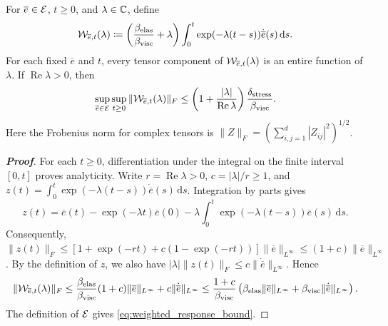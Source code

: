 {\begin{lemma}\label{lem:weighted_response}
For $\overline e\in{\mathcal{E}}$, $t\ge0$, and $\lambda\in\mathbb{C}$, define
\begin{equation}\label{eq:weighted_response_def}
{\mathcal{W}}_{\overline e,t}(\lambda)\coloneqq\left(\frac{\beta_{\rm elas}}{\beta_{\rm visc}}+\lambda\right)\int_0^t\exp(-\lambda(t-s))\dot{\overline e}(s)\,\mathrm ds.
\end{equation}
For each fixed $\overline e$ and $t$, every tensor component of ${\mathcal{W}}_{\overline e,t}(\lambda)$ is an entire function of $\lambda$. If $\operatorname{Re}\lambda>0$, then
\begin{equation}\label{eq:weighted_response_bound}
\sup_{\overline e\in{\mathcal{E}}}\sup_{t\ge0}\|{\mathcal{W}}_{\overline e,t}(\lambda)\|_F\le\left(1+\frac{|\lambda|}{\operatorname{Re}\lambda}\right)\frac{\delta_{\rm stress}}{\beta_{\rm visc}}.
\end{equation}
Here the Frobenius norm for complex tensors is $\|Z\|_F=(\sum_{i,j=1}^d|Z_{ij}|^2)^{1/2}$.
\end{lemma}

\begin{proof}[\bf Proof]
For each $t\ge0$, differentiation under the integral on the finite interval $[0,t]$ proves analyticity. Write $r=\operatorname{Re}\lambda>0$, $c=|\lambda|/r\ge1$, and $z(t)=\int_0^t\exp(-\lambda(t-s))\dot{\overline e}(s)\,\mathrm ds$. Integration by parts gives
\begin{equation*}
z(t)=\overline e(t)-\exp(-\lambda t)\overline e(0)-\lambda\int_0^t\exp(-\lambda(t-s))\overline e(s)\,\mathrm ds.
\end{equation*}
Consequently, $\|z(t)\|_F\le[1+\exp(-rt)+c(1-\exp(-rt))]\|\overline e\|_{L^\infty}\le(1+c)\|\overline e\|_{L^\infty}$. By the definition of $z$, we also have $|\lambda|\|z(t)\|_F\le c\|\dot{\overline e}\|_{L^\infty}$. Hence
\begin{align*}
\|{\mathcal{W}}_{\overline e,t}(\lambda)\|_F
\le \frac{\beta_{\rm elas}}{\beta_{\rm visc}}(1+c)\|\overline e\|_{L^\infty}+c\|\dot{\overline e}\|_{L^\infty}\le\frac{1+c}{\beta_{\rm visc}}\left(\beta_{\rm elas}\|\overline e\|_{L^\infty}+\beta_{\rm visc}\|\dot{\overline e}\|_{L^\infty}\right).
\end{align*}
The definition of ${\mathcal{E}}$ gives \cref{eq:weighted_response_bound}.
\end{proof}

}
